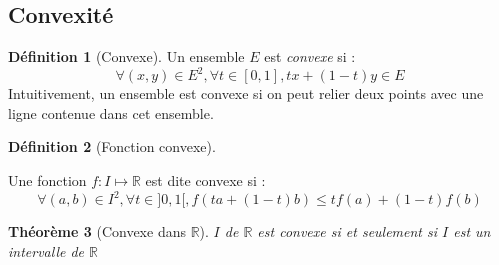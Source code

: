 \documentclass[11pt,a4paper]{report}
\newtheorem{theorem}{Théorème}[chapter]
\theoremstyle{definition}
\newtheorem{dfn}[theorem]{Définition}
\begin{document}
\subsection{Convexité}\label{sub:convexe_connexite}
\begin{dfn}[Convexe]
    \begin{minipage}{0.6\textwidth}
        Un ensemble $E$ est \emph{convexe} si : 
    \begin{equation}
    \forall (x,y) \in E^2, \forall t \in [0,1], \boxed{tx + (1-t)y \in E}
    \end{equation}
    Intuitivement, un ensemble est convexe si on peut relier deux points avec une ligne contenue dans cet ensemble.
    \end{minipage}\hspace{5mm}
    \begin{minipage}{0.3\textwidth}
    \end{minipage}
\end{dfn}
\begin{dfn}[Fonction convexe]
\label{dfn:convexe_connexite}
   \begin{minipage}{0.75\textwidth}
    Une fonction $f : I \mapsto \ensuremath{\mathbb{R}}$ est dite convexe si :
   \begin{equation}
   \forall (a,b) \in I^2, \forall t \in ]0,1[, \boxed{f(ta + (1-t)b) \le tf(a) + (1-t)f(b)}
   \end{equation}
    \end{minipage}\hspace{2mm}
    \begin{minipage}{0.2\textwidth}
    \end{minipage}
\end{dfn}
\begin{theorem}[Convexe dans \ensuremath{\mathbb{R}}]
    $I$ de $\ensuremath{\mathbb{R}}$ est convexe \emph{si et seulement si} $I$ est un intervalle de $\ensuremath{\mathbb{R}}$
\end{theorem}
\end{document}
